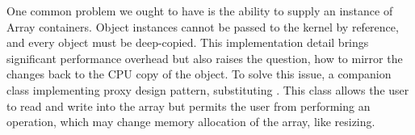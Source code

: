 One common problem we ought to have is the ability to supply an instance of Array containers. Object instances cannot be passed to the kernel by reference, and every object must be deep-copied. This implementation detail brings significant performance overhead but also raises the question, how to mirror the changes back to the CPU copy of the object. To solve this issue, a companion class  implementing proxy design pattern, substituting . This class allows the user to read and write into the array but permits the user from performing an operation, which may change memory allocation of the array, like resizing. 



